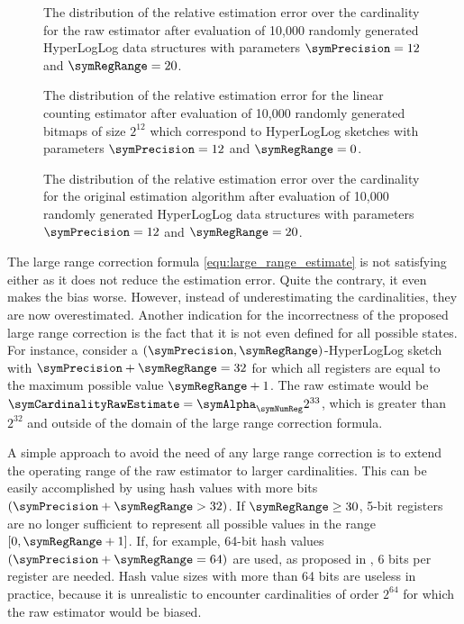 \documentclass[a4paper]{scrartcl}
\begin{document}
\begin{figure}
\centering

\caption{The distribution of the relative estimation error over the cardinality for the raw estimator after evaluation of 10,000 randomly generated HyperLogLog data structures with parameters $\symPrecision = 12$ and $\symRegRange=20$.}
\label{fig:raw_estimate}
\end{figure}

\begin{figure}
\centering

\caption{The distribution of the relative estimation error for the linear counting estimator after evaluation of 10,000 randomly generated bitmaps of size $2^{12}$ which correspond to HyperLogLog sketches with parameters $\symPrecision = 12$ and $\symRegRange=0$.}
\label{fig:small_range_estimate}
\end{figure}

\begin{figure}
\centering

\caption{The distribution of the relative estimation error over the cardinality for the original estimation algorithm after evaluation of 10,000 randomly generated HyperLogLog data structures with parameters $\symPrecision = 12$ and $\symRegRange=20$.}
\label{fig:original_estimate}
\end{figure}

The large range correction formula \eqref{equ:large_range_estimate} is not satisfying either as it does not reduce the estimation error. Quite the contrary, it even makes the bias worse. However, instead of underestimating the cardinalities, they are now overestimated. Another indication for the incorrectness of the proposed large range correction is the fact that it is not even defined for all possible states. For instance, consider a $(\symPrecision,\symRegRange)$-HyperLogLog sketch with $\symPrecision+\symRegRange=32$ for which all registers are equal to the maximum possible value $\symRegRange+1$. The raw estimate would be $\symCardinalityRawEstimate = \symAlpha_\symNumReg 2^{33}$, which is greater than $2^{32}$ and outside of the domain of the large range correction formula.

A simple approach to avoid the need of any large range correction is to extend the operating range of the raw estimator to larger cardinalities. This can be easily accomplished by using hash values with more bits $(\symPrecision+\symRegRange>32)$. If $\symRegRange \geq 30$, 5-bit registers are no longer sufficient to represent all possible values in the range $[0, \symRegRange+1]$. If, for example, 64-bit hash values $(\symPrecision+\symRegRange=64)$ are used, as proposed in \cite{Heule2013}, 6 bits per register are needed. Hash value sizes with more than 64 bits are useless in practice, because it is unrealistic to encounter cardinalities of order $2^{64}$ for which the raw estimator would be biased.
\end{document}
